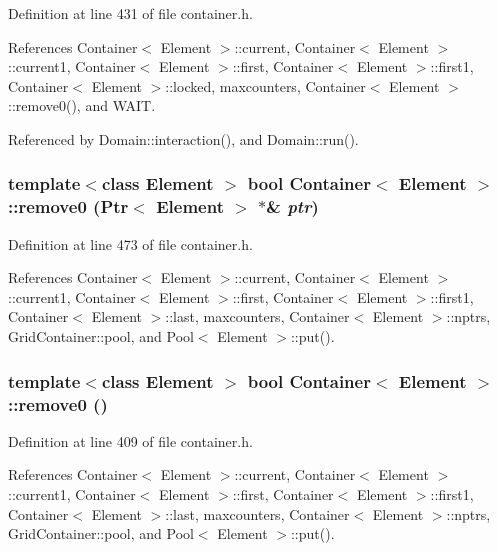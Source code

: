 Definition at line 431 of file container.h.

References Container$<$ Element $>$::current, Container$<$ Element $>$::current1, Container$<$ Element $>$::first, Container$<$ Element $>$::first1, Container$<$ Element $>$::locked, maxcounters, Container$<$ Element $>$::remove0(), and WAIT.

Referenced by Domain::interaction(), and Domain::run().\hypertarget{classContainer_edd72c6884155667dc637694abd3babc}{
\subsubsection[{remove0}]{\setlength{\rightskip}{0pt plus 5cm}template$<$class Element $>$ bool {\bf Container}$<$ Element $>$::remove0 ({\bf Ptr}$<$ Element $>$ $\ast$\& {\em ptr})}}
\label{classContainer_edd72c6884155667dc637694abd3babc}




Definition at line 473 of file container.h.

References Container$<$ Element $>$::current, Container$<$ Element $>$::current1, Container$<$ Element $>$::first, Container$<$ Element $>$::first1, Container$<$ Element $>$::last, maxcounters, Container$<$ Element $>$::nptrs, GridContainer::pool, and Pool$<$ Element $>$::put().\hypertarget{classContainer_07700ba69cf69ce61c7dad863f41a69b}{
\subsubsection[{remove0}]{\setlength{\rightskip}{0pt plus 5cm}template$<$class Element $>$ bool {\bf Container}$<$ Element $>$::remove0 ()}}
\label{classContainer_07700ba69cf69ce61c7dad863f41a69b}




Definition at line 409 of file container.h.

References Container$<$ Element $>$::current, Container$<$ Element $>$::current1, Container$<$ Element $>$::first, Container$<$ Element $>$::first1, Container$<$ Element $>$::last, maxcounters, Container$<$ Element $>$::nptrs, GridContainer::pool, and Pool$<$ Element $>$::put().

